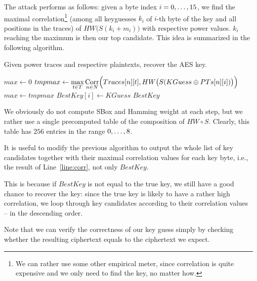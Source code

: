 	The attack performs as follows: given a byte index $i=0 , \ldots , 15$, we find the maximal correlation\footnote{We can rather use some other empirical meter, since correlation is quite expensive and we only need to find the key, no matter how.} (among all keyguesses $k_i$ of $i$-th byte of the key and all positions in the traces) of $HW\bigl(S(k_i+m_i)\bigr)$ with respective power values. $k_i$ reaching the maximum is then our top candidate. This idea is summarized in the following algorithm.
	
	\begin{alg}
	\label{alg:cpa}
	Given power traces and respective plaintexts, recover the AES key.
		\begin{algorithmic}[1]
					\State $max \gets 0$
						\State $tmpmax \gets \max\limits_{t\in T} \operatorname*{Corr}\limits_{n\in N}\Bigl(Traces[n][t], HW\bigl(S(KGuess\oplus PTs[n][i])\bigr)\Bigr)$
							\label{line:corr}
							\State $max \gets tmpmax$
							\State $BestKey[i] \gets KGuess$
						\EndIf
					\EndFor
				\EndFor
				\State\Return $BestKey$
			\EndFunction
		\end{algorithmic}
	\end{alg}
	
	\begin{remark}
	\label{rem:attacklookup}
		We obviously do not compute SBox and Hamming weight at each step, but we rather use a single precomputed table of the composition of $HW\circ S$. Clearly, this table has $256$ entries in the range $0 , \ldots , 8$.
	\end{remark}
	
	\begin{note}
	\label{note:fulllist}
		It is useful to modify the previous algorithm to output the whole list of key candidates together with their maximal correlation values for each key byte, i.e., the result of Line~\ref{line:corr}, not only $BestKey$.
		
		This is because if $BestKey$ is not equal to the true key, we still have a good chance to recover the key: since the true key is likely to have a rather high correlation, we loop through key candidates according to their correlation values -- in the descending order.
		
		Note that we can verify the correctness of our key guess simply by checking whether the resulting ciphertext equals to the ciphertext we expect.
	\end{note}
	
